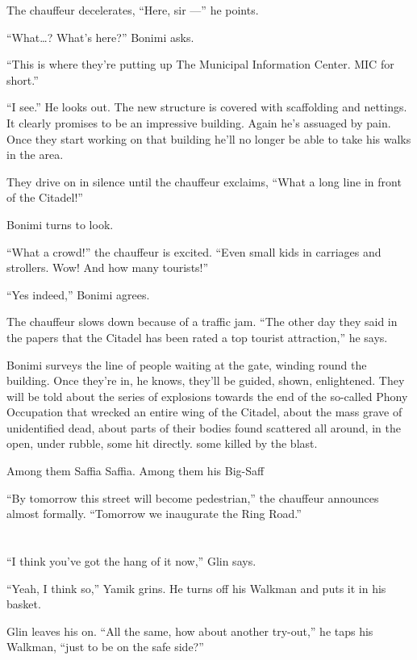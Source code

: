 \documentclass[twoside,11pt,openany]{book}
\begin{document}
The chauffeur decelerates, ``Here, sir ---'' he points.

``What{\ldots}? What's here?'' Bonimi asks.

``This is where they're putting up The Municipal Information Center. MIC for short.''

``I see.'' He looks out. The new structure is covered with scaffolding and nettings.
It{ }clearly promises to be an impressive building. Again he's assuaged by pain. Once they start
working on that building he'll no longer be able to take his walks in the area.

They drive on in silence until the chauffeur exclaims, ``What a long line in front of the
Citadel!''

Bonimi turns to look.

``What a crowd!'' the chauffeur is excited. ``Even small kids in carriages and
strollers. Wow! And how many tourists!''

``Yes indeed,'' Bonimi agrees.

The chauffeur slows down because of a traffic jam. ``The other day they said in the papers that the
Citadel has been rated a top tourist attraction,'' he says.

Bonimi surveys the line of people waiting at the gate, winding round the building. Once they're in, he knows, they'll be
guided, shown, enlightened. They will be told about the series of explosions towards the end of the so-called Phony
Occupation that wrecked an entire wing of the Citadel, about the mass grave of unidentified dead, about parts of their
bodies found scattered all around, in the open, under rubble, some hit directly. some killed by the blast.

Among them Saffia Saffia. Among them his Big-Saff

``By tomorrow this street will become pedestrian,'' the chauffeur announces almost formally.
``Tomorrow we inaugurate the Ring Road.''


\chapter{}

``I think you've got the hang of it now,'' Glin says.

``Yeah, I think so,'' Yamik grins. He turns off his Walkman and puts it in his basket.

Glin leaves his on. ``All the same, how about another try-out,'' he taps his Walkman, ``just
to be on the safe side?''
\end{document}
